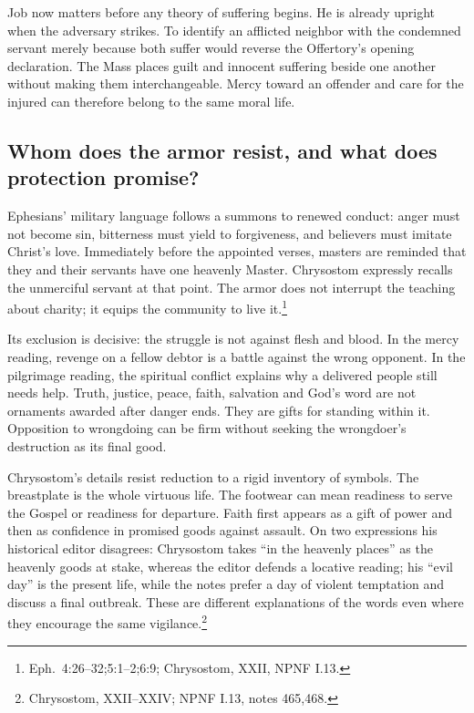 Job now matters before any theory of suffering begins. He is already upright when the adversary strikes. To identify an afflicted neighbor with the condemned servant merely because both suffer would reverse the Offertory's opening declaration. The Mass places guilt and innocent suffering beside one another without making them interchangeable. Mercy toward an offender and care for the injured can therefore belong to the same moral life.

\subsection{Whom does the armor resist, and what does protection promise?}
Ephesians' military language follows a summons to renewed conduct: anger must not become sin, bitterness must yield to forgiveness, and believers must imitate Christ's love. Immediately before the appointed verses, masters are reminded that they and their servants have one heavenly Master. Chrysostom expressly recalls the unmerciful servant at that point. The armor does not interrupt the teaching about charity; it equips the community to live it.\footnote{Eph.~4:26--32;5:1--2;6:9; Chrysostom,  XXII, NPNF I.13.}

Its exclusion is decisive: the struggle is not against flesh and blood. In the mercy reading, revenge on a fellow debtor is a battle against the wrong opponent. In the pilgrimage reading, the spiritual conflict explains why a delivered people still needs help. Truth, justice, peace, faith, salvation and God's word are not ornaments awarded after danger ends. They are gifts for standing within it. Opposition to wrongdoing can be firm without seeking the wrongdoer's destruction as its final good.

Chrysostom's details resist reduction to a rigid inventory of symbols. The breastplate is the whole virtuous life. The footwear can mean readiness to serve the Gospel or readiness for departure. Faith first appears as a gift of power and then as confidence in promised goods against assault. On two expressions his historical editor disagrees: Chrysostom takes ``in the heavenly places'' as the heavenly goods at stake, whereas the editor defends a locative reading; his ``evil day'' is the present life, while the notes prefer a day of violent temptation and discuss a final outbreak. These are different explanations of the words even where they encourage the same vigilance.\footnote{Chrysostom,  XXII--XXIV; NPNF I.13, notes 465,468.}

